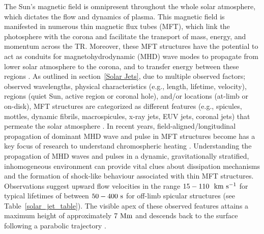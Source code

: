 %
The Sun's magnetic field is omnipresent throughout the whole solar atmosphere, which dictates the flow and dynamics of plasma. This magnetic field is manifested in numerous thin magnetic flux tubes (MFT), which link the photosphere with the corona and facilitate the transport of mass, energy, and momentum across the TR. Moreover, these MFT structures have the potential to act as conduits for magnetohydrodynamic (MHD) wave modes to propagate from lower solar atmosphere to the corona, and to transfer energy between these regions \citep{Pontieu2004Natur, Kukhianidze2006AA449L35K, Zaqarashvili2007AA474627Z, He2009AA497525H}. As outlined in section~\ref{Solar Jets}, due to multiple observed factors; observed wavelengths, physical characteristics (e.g., length, lifetime, velocity), regions (quiet Sun, active region or coronal hole), and/or locations (at-limb or on-disk), MFT structures are categorized as different features (e.g., spicules, mottles, dynamic fibrils, macrospicules, x-ray jets, EUV jets, coronal jets) that permeate the solar atmosphere \citep[see reviews by:][]{Beckers1968, Beckers1972ARA&A, Tsiropoula2012}.  In recent years, field-aligned/longitudinal propagation of dominant MHD wave and pulse in MFT structures become has a key focus of research to understand chromospheric heating \citep{Narain1990, Zaqarashvili_2009SSRv, Jess2015}. Understanding the propagation of MHD waves and pulses in a dynamic, gravitationally stratified, inhomogeneous environment can provide vital clues about dissipation mechanisms and the formation of shock-like behaviour associated with thin MFT structures. Observations suggest upward flow velocities in the range $15-110 ~~\rm{km ~s^{-1}}$ for typical lifetimes of between $50-400~\rm{s}$ for off-limb spicular structures (see Table~\ref{solar_jet_table}). The visible apex of these observed features attains a maximum height of approximately $7~\rm{Mm}$ and descends back to the surface following a parabolic trajectory \citep{Pereira2012,Pereira2016ApJ82465P}. \np
%
